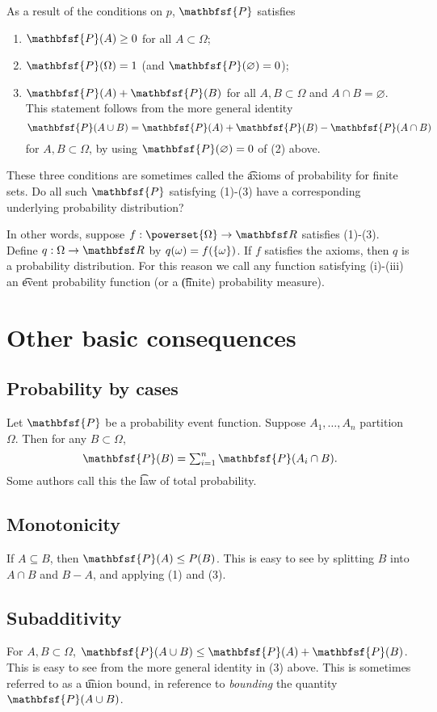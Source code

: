As a result of the conditions on $p$, $\mathbfsf{P} $ satisfies
    \begin{enumerate}
      \item $\mathbfsf{P} (A) \geq 0$ for all $A \subset \Omega $;
      \item $\mathbfsf{P} (\Omega ) = 1$ (and $\mathbfsf{P} (\varnothing) = 0$);
      \item $\mathbfsf{P} (A) + \mathbfsf{P} (B)$ for all $A, B \subset \Omega $ and $A \cap  B = \varnothing$.
This statement follows from the more general identity
          \[
\mathbfsf{P} (A \cup B) = \mathbfsf{P} (A) + \mathbfsf{P} (B) - \mathbfsf{P} (A \cap  B)
          \]
for $A, B \subset \Omega $, by using $\mathbfsf{P} (\varnothing) = 0$ of (2) above.
    \end{enumerate}

These three conditions are sometimes called the \t{axioms of probability for finite sets}.
Do all such $\mathbfsf{P} $ satisfying (1)-(3) have a corresponding underlying probability distribution?

In other words, suppose $f: \powerset{\Omega } \to \R $ satisfies (1)-(3).
Define $q: \Omega  \to \R $ by $q(\omega ) = f(\{\omega \})$.
If $f$ satisfies the axioms, then $q$ is a probability distribution.
For this reason we call any function satisfying (i)-(iii) an \t{event probability function} (or a \t{(finite) probability measure}).

\section*{Other basic consequences}

\subsection*{Probability by cases}

Let $\mathbfsf{P} $ be a probability event function.
Suppose $A_1, \dots , A_n$ partition $\Omega $.
Then for any $B \subset \Omega $,
    \[
\textstyle
\mathbfsf{P} (B) = \sum_{i = 1}^{n} \mathbfsf{P} (A_i \cap  B).
    \]
Some authors call this the \t{law of total probability}.

\subsection*{Monotonicity}

If $A \subseteq B$, then $\mathbfsf{P} (A) \leq P(B)$.
This is easy to see by splitting $B$ into $A \cap  B$ and $B - A$, and applying (1) and (3).

\subsection*{Subadditivity}

For $A, B \subset \Omega $, $\mathbfsf{P} (A \cup B) \leq \mathbfsf{P} (A) + \mathbfsf{P} (B)$.
This is easy to see from the more general identity in (3) above.
This is sometimes referred to as a \t{union bound}, in reference to \textit{bounding} the quantity $\mathbfsf{P} (A \cup B)$.
